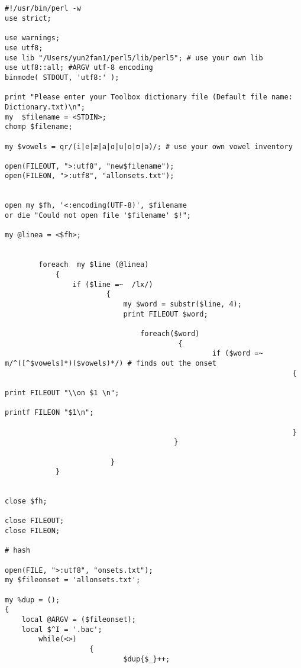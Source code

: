 \documentclass[11pt, a4paper]{book}              %
\begin{document}
\begin{lstlisting}


#!/usr/bin/perl -w
use strict;

use warnings;
use utf8;
use lib "/Users/yun2fan1/perl5/lib/perl5"; # use your own lib
use utf8::all; #ARGV utf-8 encoding
binmode( STDOUT, 'utf8:' );

print "Please enter your Toolbox dictionary file (Default file name: Dictionary.txt)\n";
my  $filename = <STDIN>;
chomp $filename;

my $vowels = qr/(i|e|æ|a|ɑ|u|o|ʊ|ə)/; # use your own vowel inventory

open(FILEOUT, ">:utf8", "new$filename");
open(FILEON, ">:utf8", "allonsets.txt");


open my $fh, '<:encoding(UTF-8)', $filename
or die "Could not open file '$filename' $!";
  
my @linea = <$fh>;


        foreach  my $line (@linea) 
            { 
                if ($line =~  /lx/)
                        {
                            my $word = substr($line, 4);
                            print FILEOUT $word;
                           
                                foreach($word)
                                         { 
                                                 if ($word =~  m/^([^$vowels]*)($vowels)*/) # finds out the onset
                                                                    {   
                                                                            print FILEOUT "\\on $1 \n";
                                                                            printf FILEON "$1\n";
                                                                            
                                                                    }
                                        }
                
                         }
            }   
             
             
close $fh;

close FILEOUT;
close FILEON;

# hash

open(FILE, ">:utf8", "onsets.txt");
my $fileonset = 'allonsets.txt';

my %dup = ();
{
    local @ARGV = ($fileonset);
    local $^I = '.bac';
        while(<>)
                    {  
                            $dup{$_}++;
                            

\end{lstlisting}
\end{document}
